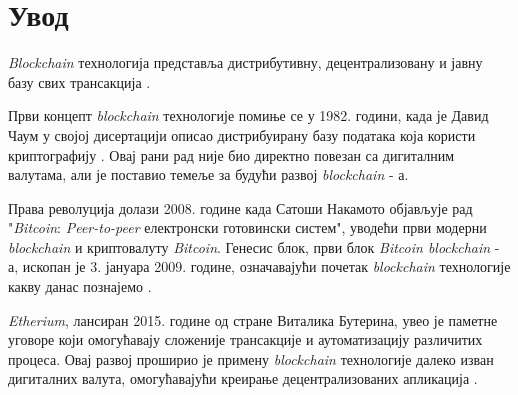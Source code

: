 \documentclass[12pt, a4paper]{article}
\begin{document}




\renewcommand{\contentsname}{Садржај} %
\tableofcontents %
\clearpage %
\setcounter{page}{1}
\pagestyle{fancy}
\fancyhf{} %
\fancyfoot[R]{\thepage} %
\renewcommand{\headrule}{} %

\section{Увод}
\textit{Blockchain} технологија представља дистрибутивну, децентрализовану и јавну базу свих трансакција \cite{1}.


Први концепт \textit{blockchain} технологије помиње се у 1982. години, када је Давид Чаум у својој дисертацији описао дистрибуирану базу података која користи криптографију \cite{2}. Овај рани рад није био директно повезан са дигиталним валутама, али је поставио темеље за будући развој \textit{blockchain} - а.

Права револуција долази 2008. године када Сатоши Накамото објављује рад "\textit{Bitcoin}: \textit{Peer-to-peer} електронски готовински систем", уводећи први модерни \textit{blockchain} и криптовалуту \textit{Bitcoin}. Генесис блок, први блок \textit{Bitcoin blockchain} - а, ископан је 3. јануара 2009. године, означавајући почетак \textit{blockchain} технологије какву данас познајемо \cite{3}.

\textit{Etherium}, лансиран 2015. године од стране Виталика Бутерина, увео је паметне уговоре који омогућавају сложеније трансакције и аутоматизацију различитих процеса. Овај развој проширио је примену \textit{blockchain} технологије далеко изван дигиталних валута, омогућавајући креирање децентрализованих апликација \cite{4}.
\end{document}

